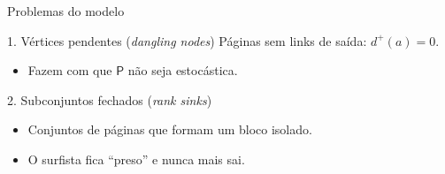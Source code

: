 \documentclass[aspectratio=169]{beamer}
\begin{document}
\begin{frame}{Problemas do modelo}
\begin{block}{1. Vértices pendentes (\emph{dangling nodes})}
  Páginas sem links de saída: $d^+(a)=0$.
  \begin{itemize}
    \item Fazem com que $\mathsf{P}$ não seja estocástica.
  \end{itemize}
\end{block}
\vfill
\begin{block}{2. Subconjuntos fechados (\emph{rank sinks})}
  \begin{itemize}
    \item Conjuntos de páginas que formam um bloco isolado.
    \item O surfista fica “preso” e nunca mais sai.
  \end{itemize}
\end{block}
\end{frame}
\end{document}
